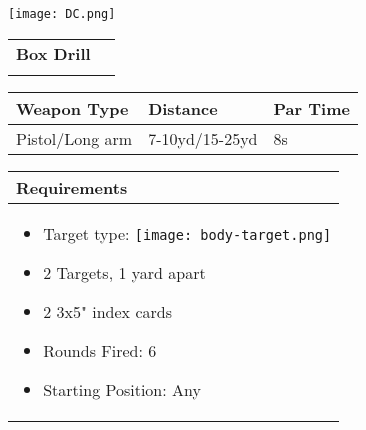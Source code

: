 \documentclass[../Cover.tex]{subfiles}
\begin{document}
	\begin{minipage}[t][0.2\textheight][t]{0.1\textwidth} 
		\texttt{[image: DC.png]}
	\end{minipage}
	\hfill
	\begin{minipage}[t][0.2\textheight][t]{0.8\textwidth}
		\begin{tabular}{ p{} l  }		
			\\	
			\textbf{Box Drill} \\
			\\[0.09\textheight]
		\end{tabular}
		\quad
		\begin{tabular}{ | p{} | p{} | p{} |}
			\hline
			\rowcolor[HTML]{C0C0C0}\tiny Weapon Type & \tiny Distance & \tiny Par Time\\ 
			\hline
			\tiny Pistol/Long arm & \tiny 7-10yd/15-25yd & \tiny 8s \\ %
			\hline
		\end{tabular}
	\end{minipage}
	\begin{tabular}{p{}}
		\small Requirements \\
		\hline
		\tiny \begin{itemize} %
			\item Target type: \texttt{[image: body-target.png]}
			\item 2 Targets, 1 yard apart
			\item 2 3x5" index cards
			\item Rounds Fired: 6
			\item Starting Position: Any
		\end{itemize}
					
		\\[0.6\textheight]
	\end{tabular}
\end{document}
